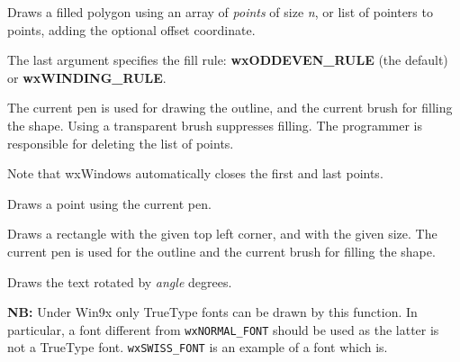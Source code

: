 Draws a filled polygon using an array of {\it points} of size {\it n},
or list of pointers to points, adding the optional offset coordinate.

The last argument specifies the fill rule: {\bf wxODDEVEN\_RULE} (the
default) or {\bf wxWINDING\_RULE}.

The current pen is used for drawing the outline, and the current brush
for filling the shape.  Using a transparent brush suppresses filling.
The programmer is responsible for deleting the list of points.

Note that wxWindows automatically closes the first and last points.



\label{wxdcdrawpoint}


Draws a point using the current pen.

\label{wxdcdrawrectangle}


Draws a rectangle with the given top left corner, and with the given
size.  The current pen is used for the outline and the current brush
for filling the shape.

\label{wxdcdrawrotatedtext}


Draws the text rotated by {\it angle} degrees.

{\bf NB:} Under Win9x only TrueType fonts can be drawn by this function. In
particular, a font different from {\tt wxNORMAL\_FONT} should be used as the
latter is not a TrueType font. {\tt wxSWISS\_FONT} is an example of a font
which is.



\label{wxdcdrawroundedrectangle}

